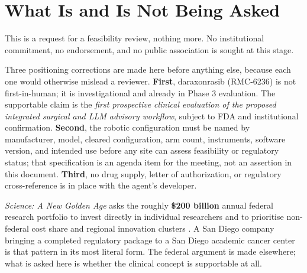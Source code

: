 \section{What Is and Is Not Being Asked}

This is a request for a feasibility review, nothing more. No institutional
commitment, no endorsement, and no public association is sought at this stage.

Three positioning corrections are made here before anything else, because each
one would otherwise mislead a reviewer. \textbf{First}, daraxonrasib
(RMC-6236) is not first-in-human; it is investigational and already in Phase 3
evaluation. The supportable claim is the \textit{first prospective clinical
evaluation of the proposed integrated surgical and LLM advisory workflow},
subject to FDA and institutional confirmation. \textbf{Second}, the robotic
configuration must be named by manufacturer, model, cleared configuration, arm
count, instruments, software version, and intended use before any site can
assess feasibility or regulatory status; that specification is an agenda item
for the meeting, not an assertion in this document. \textbf{Third}, no drug
supply, letter of authorization, or regulatory cross-reference is in place with
the agent's developer.

\textit{Science: A New Golden Age} asks the roughly \textbf{\$200 billion}
annual federal research portfolio to invest directly in individual researchers
and to prioritise non-federal cost share and regional innovation clusters
\cite{kratsios2026sciencegoldenage,kratsiosvought2026fy2028priorities}. A San
Diego company bringing a completed regulatory package to a San Diego academic
cancer center is that pattern in its most literal form. The federal argument is
made elsewhere; what is asked here is whether the clinical concept is
supportable at all.
